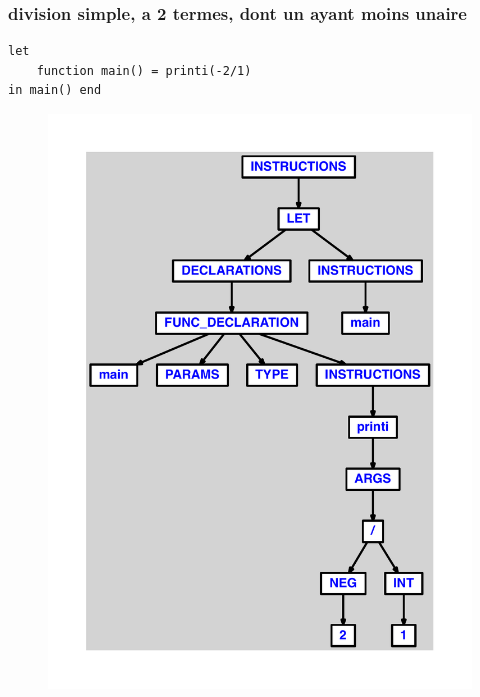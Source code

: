 \documentclass{article}
\begin{document}
\subsubsection{division simple, a 2 termes, dont un ayant moins unaire}
\begin{lstlisting}
let
	function main() = printi(-2/1)
in main() end
\end{lstlisting}
\newpage
\begin{figure}[H]
\centering
\includegraphics[max width=\textwidth]{ast/ast_66.pdf}
\end{figure}
\newpage
\end{document}
